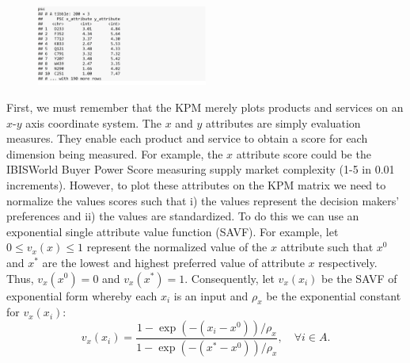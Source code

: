 \documentclass[twocolumn]{svjour3}       %
\begin{document}
\begin{figure}[!htb]
  \includegraphics[width=0.5\textwidth]{code4.png}
\end{figure}

First, we must remember that the KPM merely plots products and services on an $x$-$y$ axis coordinate system.  The $x$ and $y$ attributes are simply evaluation measures. They enable each product and service to obtain a score for each dimension being measured. For example, the $x$ attribute score could be the IBISWorld Buyer Power Score measuring supply market complexity (1-5 in 0.01 increments). However, to plot these attributes on the KPM matrix we need to normalize the values scores such that i) the values represent the decision makers' preferences and ii) the values are standardized. To do this we can use an exponential single attribute value function (SAVF). For example, let $0 \le v_x\left(x\right) \le 1$ represent the normalized value of the $x$ attribute such that $x^0$ and $x^*$ are the lowest and highest preferred value of attribute $x$ respectively. Thus, $v_x\left(x^0\right) = 0$ and $v_x\left(x^*\right) = 1$. Consequently, let $v_x\left(x_i\right)$ be the SAVF of exponential form whereby each $x_i$ is an input and $\rho_x$ be the exponential constant for $v_x\left(x_i\right)$:
\begin{equation}
\label{eqn:1}
v_x\left(x_i\right) = \frac{1 - \exp\left(-\left(x_i - x^0\right)\right) / \rho_x}{1 - \exp\left(-\left(x^* - x^0\right)\right) / \rho_x}, \quad \forall i \in A.
\end{equation}
\end{document}
